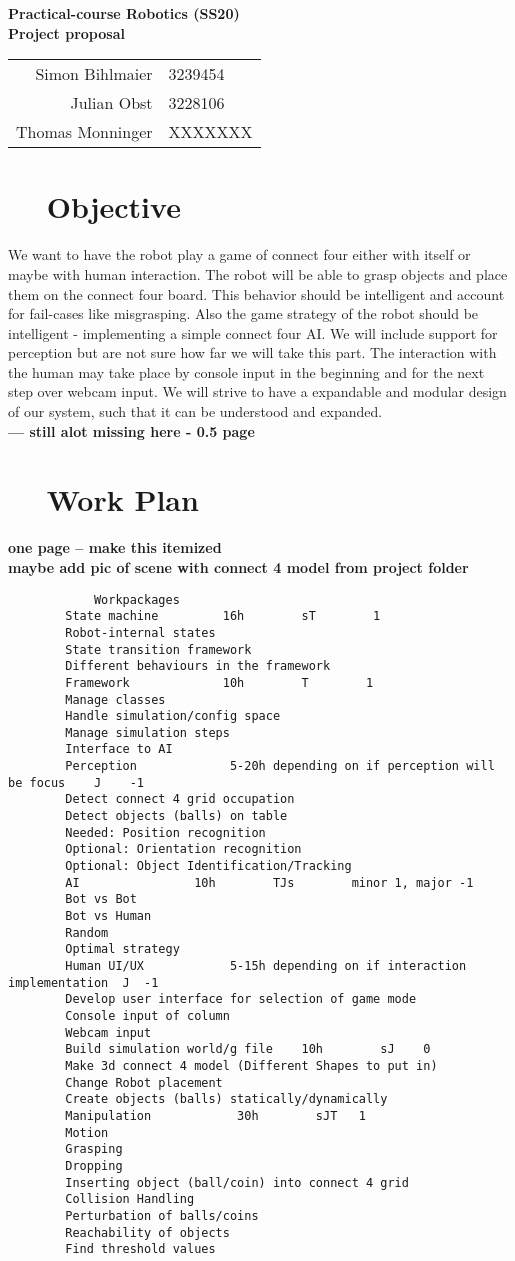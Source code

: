 \documentclass[11pt,pdftex,a4paper]{article}
\newcounter{sheetnumber}
\newcounter{exnum}
\renewcommand{\title}
{\begin{center}
		\begin{Huge}
            \textbf{Practical-course Robotics (SS20)}\\[0.3cm]
			 \textbf{Project proposal} \\[0.3cm]
		\end{Huge}
		
		\begin{tabular}{rl}
			Simon Bihlmaier	 	 & 3239454 \\
			Julian Obst 		 & 3228106 \\
			Thomas Monninger	 & XXXXXXX \\
		\end{tabular}
		
	\end{center}
	
}
\newcommand{\ex}[1]{\section*{\theexnum $\quad$ #1 \stepcounter{exnum}}}
\begin{document}
	
	
	\setcounter{exnum}{1}
	\setcounter{sheetnumber}{0}
	\thispagestyle{empty}
	\title

    \ex{Objective}
	
	We want to have the robot play a game of connect four either with itself or maybe with human interaction. The robot will be able to grasp objects and place them on the connect four board. This behavior should be intelligent and account for fail-cases like misgrasping. Also the game strategy of the robot should be intelligent - implementing a simple connect four AI. We will include support for perception but are not sure how far we will take this part. The interaction with the human may take place by console input in the beginning and for the next step over webcam input. We will strive to have a expandable and modular design of our system, such that it can be understood and expanded.
	\\
	\textbf{--- still alot missing here - 0.5 page}
    \\
    
	\ex{Work Plan}
	\textbf{one page -- make this itemized}
	\\
	\textbf{maybe add pic of scene with connect 4 model from project folder}
	\begin{lstlisting}
			Workpackages
		State machine         16h        sT        1
		Robot-internal states
		State transition framework
		Different behaviours in the framework
		Framework             10h        T        1
		Manage classes 
		Handle simulation/config space
		Manage simulation steps
		Interface to AI
		Perception             5-20h depending on if perception will be focus    J    -1 
		Detect connect 4 grid occupation
		Detect objects (balls) on table
		Needed: Position recognition
		Optional: Orientation recognition
		Optional: Object Identification/Tracking
		AI                10h        TJs        minor 1, major -1
		Bot vs Bot
		Bot vs Human
		Random
		Optimal strategy
		Human UI/UX            5-15h depending on if interaction implementation  J  -1
		Develop user interface for selection of game mode
		Console input of column
		Webcam input
		Build simulation world/g file    10h        sJ    0
		Make 3d connect 4 model (Different Shapes to put in)
		Change Robot placement
		Create objects (balls) statically/dynamically
		Manipulation            30h        sJT   1
		Motion
		Grasping
		Dropping
		Inserting object (ball/coin) into connect 4 grid
		Collision Handling
		Perturbation of balls/coins
		Reachability of objects
		Find threshold values
	\end{lstlisting}

	
    
	
\end{document}
